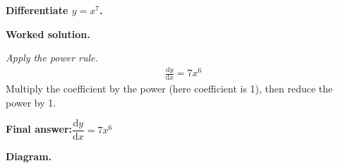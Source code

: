 \documentclass[11pt]{article}
\newcommand{\question}[1]{\par\medskip\noindent\textbf{#1}\par}
\begin{document}
\question{Differentiate \( y = x^7 \).}

\textbf{Worked solution.}

\textit{Apply the power rule.}
\[\begin{gathered}
\frac{\mathrm{d}y}{\mathrm{d}x} = 7x^6
\end{gathered}\]
Multiply the coefficient by the power (here coefficient is 1), then reduce the power by 1.

\begin{answerbox}
\textbf{Final answer:}\quad \(\displaystyle  \dfrac{\mathrm{d}y}{\mathrm{d}x} = 7x^6 \)
\end{answerbox}
\textbf{Diagram.}

\begin{center}
\end{center}
\end{document}
